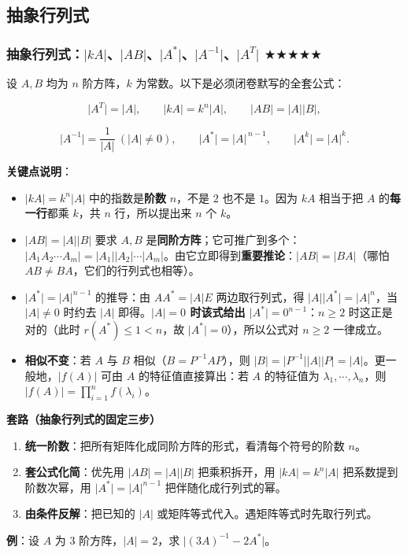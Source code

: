 \documentclass[11pt,openany,UTF8]{ctexbook}
\begin{document}
\subsection{抽象行列式}

\subsubsection{抽象行列式：$\vert kA\vert$、$\vert AB\vert$、$\vert A^*\vert$、$\vert A^{-1}\vert$、$\vert A^T\vert$ $\bigstar$$\bigstar$$\bigstar$$\bigstar$$\bigstar$}

设 $A,B$ 均为 $n$ 阶方阵，$k$ 为常数。以下是必须闭卷默写的全套公式：

\[\vert A^T\vert=\vert A\vert,\qquad \vert kA\vert=k^n\vert A\vert,\qquad \vert AB\vert=\vert A\vert\vert B\vert,\]

\[\vert A^{-1}\vert=\frac{1}{\vert A\vert}\ (\vert A\vert\ne0),\qquad \vert A^*\vert=\vert A\vert^{\,n-1},\qquad \vert A^k\vert=\vert A\vert^k .\]

\textbf{关键点说明}：

\begin{itemize}
\item $\vert kA\vert=k^n\vert A\vert$ 中的指数是\textbf{阶数} $n$，不是 $2$ 也不是 $1$。因为 $kA$ 相当于把 $A$ 的\textbf{每一行}都乘 $k$，共 $n$ 行，所以提出来 $n$ 个 $k$。
\item $\vert AB\vert=\vert A\vert\vert B\vert$ 要求 $A,B$ 是\textbf{同阶方阵}；它可推广到多个：$\vert A_1A_2\cdots A_m\vert=\vert A_1\vert\vert A_2\vert\cdots\vert A_m\vert$。由它立即得到\textbf{重要推论}：$\vert AB\vert=\vert BA\vert$（哪怕 $AB\ne BA$，它们的行列式也相等）。
\item $\vert A^*\vert=\vert A\vert^{n-1}$ 的推导：由 $AA^*=\vert A\vert E$ 两边取行列式，得 $\vert A\vert\vert A^*\vert=\vert A\vert^n$，当 $\vert A\vert\ne0$ 时约去 $\vert A\vert$ 即得。\textbf{$\vert A\vert=0$ 时该式给出 $\vert A^*\vert=0^{n-1}$}：$n\ge2$ 时这正是对的（此时 $r(A^*)\le1<n$，故 $\vert A^*\vert=0$），所以公式对 $n\ge2$ 一律成立。
\item \textbf{相似不变}：若 $A$ 与 $B$ 相似（$B=P^{-1}AP$），则 $\vert B\vert=\vert P^{-1}\vert\vert A\vert\vert P\vert=\vert A\vert$。更一般地，$\vert f(A)\vert$ 可由 $A$ 的特征值直接算出：若 $A$ 的特征值为 $\lambda_1,\cdots,\lambda_n$，则 $\vert f(A)\vert=\prod_{i=1}^{n}f(\lambda_i)$。
\end{itemize}
\textbf{套路（抽象行列式的固定三步）}

\begin{enumerate}
\item \textbf{统一阶数}：把所有矩阵化成同阶方阵的形式，看清每个符号的阶数 $n$。
\item \textbf{套公式化简}：优先用 $\vert AB\vert=\vert A\vert\vert B\vert$ 把乘积拆开，用 $\vert kA\vert=k^n\vert A\vert$ 把系数提到阶数次幂，用 $\vert A^*\vert=\vert A\vert^{n-1}$ 把伴随化成行列式的幂。
\item \textbf{由条件反解}：把已知的 $\vert A\vert$ 或矩阵等式代入。遇矩阵等式时先取行列式。
\end{enumerate}
\textbf{例}：设 $A$ 为 $3$ 阶方阵，$\vert A\vert=2$，求 $\vert (3A)^{-1}-2A^*\vert$。
\end{document}
